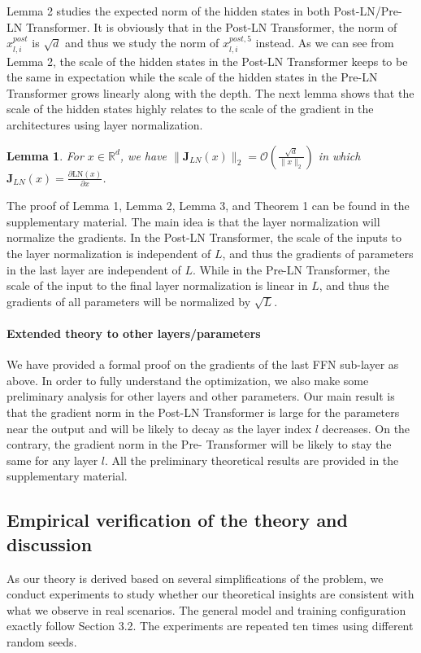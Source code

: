 \documentclass{article}
\newtheorem{lemma}{Lemma}
\begin{document}
Lemma 2 studies the expected norm of the hidden states in both Post-LN/Pre-LN Transformer. It is obviously that in the Post-LN Transformer, the norm of $x_{l,i}^{post}$ is $\sqrt{d}$ and thus we study the norm of $x^{post,5}_{l,i}$ instead. As we can see from Lemma 2, the scale of the hidden states in the Post-LN Transformer keeps to be the same in expectation while the scale of the hidden states in the Pre-LN Transformer grows linearly along with the depth. The next lemma shows that the scale of the hidden states highly relates to the scale of the gradient in the architectures using layer normalization.

\begin{lemma}\label{l2}
For $x\in \mathbb{R}^d$, we have $\|\mathbf{J}_{LN}(x)\|_2=\mathcal{O}(\frac{\sqrt{d}}{\|x\|_2})$
in which $\mathbf{J}_{LN}(x)=\frac{\partial\text{LN}(x)}{\partial x}$.
\end{lemma}

The proof of Lemma 1, Lemma 2, Lemma 3, and Theorem 1 can be found in the supplementary material. The main idea is that the layer normalization will normalize the gradients. In the Post-LN Transformer, the scale of the inputs to the layer normalization is independent of $L$, and thus the gradients of parameters in the last layer are independent of $L$. While in the Pre-LN Transformer, the scale of the input to the final layer normalization is linear in $L$, and thus the gradients of all parameters will be normalized by $\sqrt{L}$.

\paragraph{Extended theory to other layers/parameters}
We have provided a formal proof on the gradients of the last FFN sub-layer as above. In order to fully understand the optimization, we also make some preliminary analysis for other layers and other parameters. Our main result is that the gradient norm in the Post-LN Transformer is large for the parameters near the output and will be likely to decay as the layer index $l$ decreases. On the contrary, the gradient norm in the Pre- Transformer will be likely to stay the same for any layer $l$. All the preliminary theoretical results are provided in the supplementary material.

\subsection{Empirical verification of the theory and discussion}
As our theory is derived based on several simplifications of the problem, we conduct experiments to study whether our theoretical insights are consistent with what we observe in real scenarios. The general model and training configuration exactly follow Section 3.2. The experiments are repeated ten times using different random seeds. 
\end{document}
